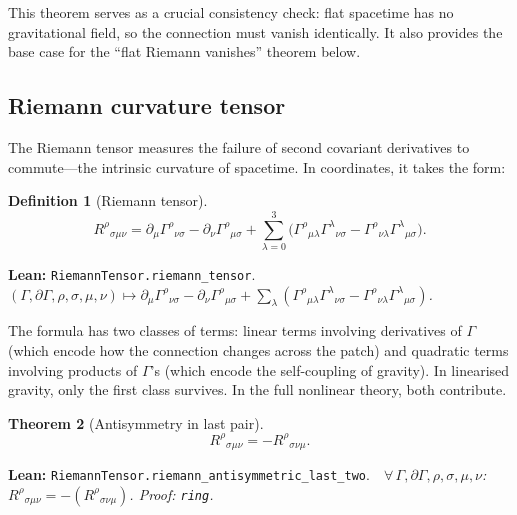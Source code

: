 \documentclass[11pt,a4paper]{article}
\newtheorem{theorem}{Theorem}[section]
\newtheorem{definition}[theorem]{Definition}
\newcommand{\lean}[1]{\texttt{#1}}
\newcommand{\leanref}[2]{\noindent\textbf{Lean:} \lean{#1}.\ \ \textit{#2}}
\begin{document}
\noindent This theorem serves as a crucial consistency check: flat spacetime has no gravitational field, so the connection must vanish identically.
It also provides the base case for the ``flat Riemann vanishes'' theorem below.

\subsection{Riemann curvature tensor}

The Riemann tensor measures the failure of second covariant derivatives to commute---the intrinsic curvature of spacetime.
In coordinates, it takes the form:

\begin{definition}[Riemann tensor]
\label{def:riemann}
\begin{equation}\label{eq:riemann}
R^\rho{}_{\sigma\mu\nu} = \partial_\mu\Gamma^\rho{}_{\nu\sigma} - \partial_\nu\Gamma^\rho{}_{\mu\sigma} + \sum_{\lambda=0}^{3}\bigl(\Gamma^\rho{}_{\mu\lambda}\Gamma^\lambda{}_{\nu\sigma} - \Gamma^\rho{}_{\nu\lambda}\Gamma^\lambda{}_{\mu\sigma}\bigr).
\end{equation}
\end{definition}

\leanref{RiemannTensor.riemann\_tensor}{$(\Gamma, \partial\Gamma, \rho, \sigma, \mu, \nu) \mapsto \partial_\mu\Gamma^\rho{}_{\nu\sigma} - \partial_\nu\Gamma^\rho{}_{\mu\sigma} + \sum_\lambda(\Gamma^\rho{}_{\mu\lambda}\Gamma^\lambda{}_{\nu\sigma} - \Gamma^\rho{}_{\nu\lambda}\Gamma^\lambda{}_{\mu\sigma})$.}

\noindent The formula has two classes of terms: linear terms involving derivatives of $\Gamma$ (which encode how the connection changes across the patch) and quadratic terms involving products of $\Gamma$'s (which encode the self-coupling of gravity).
In linearised gravity, only the first class survives.
In the full nonlinear theory, both contribute.

\begin{theorem}[Antisymmetry in last pair]
\label{thm:antisym}
\begin{equation}\label{eq:antisym}
R^\rho{}_{\sigma\mu\nu} = -R^\rho{}_{\sigma\nu\mu}.
\end{equation}
\end{theorem}

\leanref{RiemannTensor.riemann\_antisymmetric\_last\_two}{$\forall\,\Gamma,\partial\Gamma,\rho,\sigma,\mu,\nu$: $R^\rho{}_{\sigma\mu\nu} = -(R^\rho{}_{\sigma\nu\mu})$. Proof: \texttt{ring}.}
\end{document}
